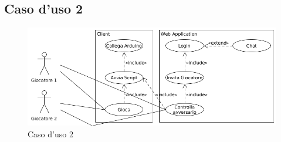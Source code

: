 \newpage
\subsection{Caso d'uso 2}
\begin{figure}[!ht]
	\centering
	\includegraphics[scale=.4]{img/UML/UseCases/case2.png}
	\caption{Caso d'uso 2}
\end{figure}

